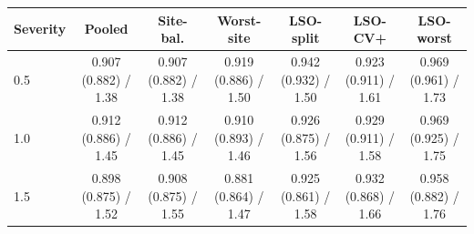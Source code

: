 \begin{tabular}{lcccccc}
\toprule
Severity & Pooled & Site-bal. & Worst-site & LSO-split & LSO-CV+ & LSO-worst \\
\midrule
0.5 & 0.907 (0.882) / 1.38 & 0.907 (0.882) / 1.38 & 0.919 (0.886) / 1.50 & 0.942 (0.932) / 1.50 & 0.923 (0.911) / 1.61 & 0.969 (0.961) / 1.73 \\
1.0 & 0.912 (0.886) / 1.45 & 0.912 (0.886) / 1.45 & 0.910 (0.893) / 1.46 & 0.926 (0.875) / 1.56 & 0.929 (0.911) / 1.58 & 0.969 (0.925) / 1.75 \\
1.5 & 0.898 (0.875) / 1.52 & 0.908 (0.875) / 1.55 & 0.881 (0.864) / 1.47 & 0.925 (0.861) / 1.58 & 0.932 (0.868) / 1.66 & 0.958 (0.882) / 1.76 \\
\bottomrule
\end{tabular}